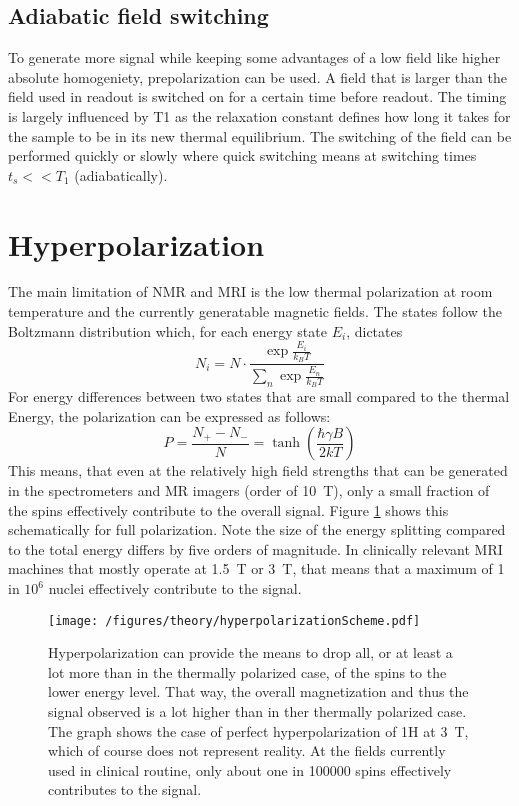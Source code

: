         \subsection{Adiabatic field switching}
        To generate more signal while keeping some advantages of a low field like higher absolute homogeniety, prepolarization can be used. A field that is larger than the field used in readout is switched on for a certain time before readout. The timing is largely influenced by T1 as the relaxation constant defines how long it takes for the sample to be in its new thermal equilibrium. The switching of the field can be performed quickly or slowly where quick switching means at switching times $t_s << T_1$ (adiabatically). 
    \section{Hyperpolarization}
        The main limitation of NMR and MRI is the low thermal polarization at room temperature and the currently generatable magnetic fields. The states follow the Boltzmann distribution \cite{canet_para-hydrogen_2006} which, for each energy state $E_i$, dictates
        \begin{equation}
            N_i = N \cdot\frac{\exp{\frac{E_i}{k_B T}}}{\sum_n\exp{\frac{E_n}{k_BT}}}
        \end{equation}
        For energy differences between two states that are small compared to the thermal Energy, the polarization can be expressed as follows:
        \begin{equation}
            P = \frac{N_+-N_-}{N} = \tanh\left(\frac{\hbar \gamma B}{2 k T }\right)
            \label{equation:theory:polarization}
        \end{equation}
        This means, that even at the relatively high field strengths that can be generated in the spectrometers and MR imagers (order of \SI{10}{\tesla}), only a small fraction of the spins effectively contribute to the overall signal. Figure \ref{figure:theory:boltzmannDistribution} shows this schematically for full polarization. Note the size of the energy splitting compared to the total energy differs by five orders of magnitude. In clinically relevant MRI machines that mostly operate at \SI{1.5}{\tesla} or \SI{3}{\tesla}, that means that a maximum of 1 in $10^6$ nuclei effectively contribute to the signal.
        \begin{figure}
            \centering
            \texttt{[image: /figures/theory/hyperpolarizationScheme.pdf]}
            \caption[Hyperpolarization scheme]{Hyperpolarization can provide the means to drop all, or at least a lot more than in the thermally polarized case, of the spins to the lower energy level. That way, the overall magnetization and thus the signal observed is a lot higher than in ther thermally polarized case. The graph shows the case of perfect hyperpolarization of 1H at \SI{3}{\tesla}, which of course does not represent reality. At the fields currently used in clinical routine, only about one in 100000 spins effectively contributes to the signal.}
            \label{figure:theory:boltzmannDistribution}
        \end{figure}
